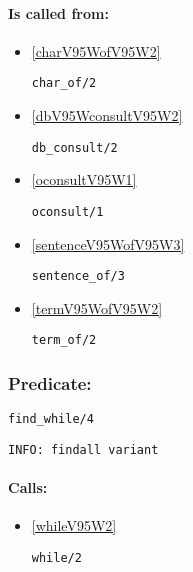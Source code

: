 \paragraph{Is called from:} 
\begin{itemize}
\item \ref{charV95WofV95W2} 
\begin{verbatim}
char_of/2
\end{verbatim}

\item \ref{dbV95WconsultV95W2} 
\begin{verbatim}
db_consult/2
\end{verbatim}

\item \ref{oconsultV95W1} 
\begin{verbatim}
oconsult/1
\end{verbatim}

\item \ref{sentenceV95WofV95W3} 
\begin{verbatim}
sentence_of/3
\end{verbatim}

\item \ref{termV95WofV95W2} 
\begin{verbatim}
term_of/2
\end{verbatim}

\end{itemize}

\subsubsection{Predicate:} \label{findV95WwhileV95W4}

\begin{verbatim}
find_while/4
\end{verbatim}

{\small \begin{verbatim}
INFO: findall variant

\end{verbatim}}
\paragraph{Calls:} 
\begin{itemize}
\item \ref{whileV95W2} 
\begin{verbatim}
while/2
\end{verbatim}

\end{itemize}

